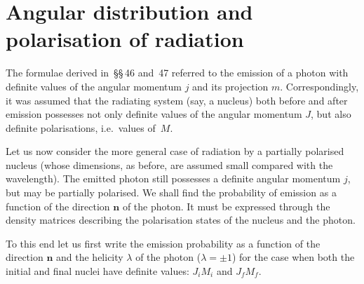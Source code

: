 \section{Angular distribution and polarisation of radiation}

The formulae derived in~\S\S\,46 and~47 referred to the emission of a photon with definite values of the angular momentum $j$ and its projection $m$. Correspondingly, it was assumed that the radiating system (say, a nucleus) both before and after emission possesses not only definite values of the angular momentum $J$, but also definite polarisations, i.e.\ values of~$M$.

Let us now consider the more general case of radiation by a partially polarised nucleus (whose dimensions, as before, are assumed small compared with the wavelength). The emitted photon still possesses a definite angular momentum $j$, but may be partially polarised. We shall find the probability of emission as a function of the direction $\mathbf{n}$ of the photon. It must be expressed through the density matrices describing the polarisation states of the nucleus and the photon.

To this end let us first write the emission probability as a function of the direction $\mathbf{n}$ and the helicity $\lambda$ of the photon ($\lambda = \pm 1$) for the case when both the initial and final nuclei have definite values: $J_i M_i$ and $J_f M_f$.

